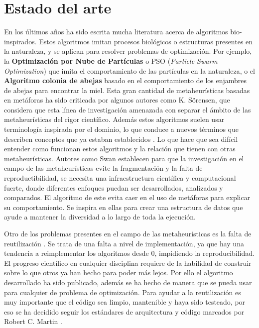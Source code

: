 \chapter{Estado del arte}

En los últimos años ha sido escrita mucha literatura acerca de algoritmos bio-inspirados. Estos algoritmos imitan procesos biológicos o estructuras presentes
en la naturaleza, y se aplican para resolver problemas de optimización. Por ejemplo, la \textbf{Optimización por Nube de Partículas} o PSO (\textit{Particle Swarm Optimization})
que imita el comportamiento de las partículas en la naturaleza, o el \textbf{Algoritmo colonia de abejas} basado en el comportamiento de los enjambres de abejas
para encontrar la miel. Esta gran cantidad de metaheurísticas basadas en metáforas ha sido criticada por algunos autores como K. Sörensen\cite{https://doi.org/10.1111/itor.12001},
que considera que esta línea de investigación amenazada con separar el ámbito de las metaheurísticas del rigor científico. Además estos algoritmos suelen usar terminología inspirada por el dominio,
lo que conduce a nuevos términos que describen conceptos que ya estaban establecidos \cite{mitigating_metaphors}. Lo que hace que sea difícil entender como funcionan estos algoritmos
y la relación que tienen con otras metaheurísticas. Autores como Swan \cite{metaheuristics} establecen para que la investigación en el campo de las metaheurísticas evite la fragmentación y 
la falta de reproductibilidad, se necesita una infraestructura científica y computacional fuerte, donde diferentes enfoques puedan ser desarrollados, analizados y comparados. El algoritmo de este 
evita caer en el uso de metáforas para explicar su comportamiento. Se inspira en ellas para crear una estructura de datos que ayude a mantener la diversidad a lo largo de toda la ejecución.

Otro de los problemas presentes en el campo de las metaheurísticas es la falta de reutilización \cite{metaheuristics}. Se trata de una falta a nivel de implementación, ya que hay una
tendencia a reimplementar los algoritmos desde 0, impidiendo la reproducibilidad. El progreso científico en cualquier disciplina requiere de la habilidad de construir sobre lo que
otros ya han hecho para poder más lejos. Por ello el algoritmo desarrollado ha sido publicado, además se ha hecho de manera que se pueda usar para cualquier de problema de optimización.
Para ayudar a la reutilización es muy importante que el código sea limpio, mantenible y haya sido testeado, por eso se ha decidido seguir los estándares de arquitectura y código marcados 
por Robert C. Martin \cite{cleanArquitecture2017, cleanCode2008}.


